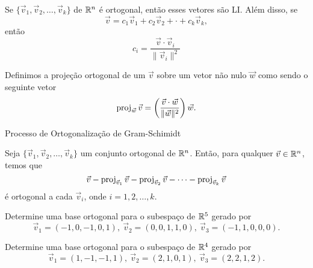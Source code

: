 \begin{frame}[label=orto]{}
\begin{teo}
Se $\{\vec{v}_1,\vec{v}_2,\ldots, \vec{v}_k\}$  de $\mathbb{R}^n$  é ortogonal, então esses vetores são LI. Além disso, se
\[\vec{v}=c_1\vec{v}_1+c_2\vec{v}_2+\cdot +c_k\vec{v}_k,\]
então
\[c_i=\frac{\vec{v}\cdot \vec{v}_i}{\|\vec{v}_i\|^2}\] 
\end{teo}

\begin{defin}
Definimos a {\color{blue}projeção ortogonal} de um $\vec{v}$ sobre um vetor  {\color{red} não nulo} $\vec{w}$ como sendo o seguinte vetor
\[\operatorname{proj}_{\vec{w}}\vec{v}=\left(\frac{\vec{v}\cdot \vec{w}}{\|\vec{w}\|^2}\right)\vec{w}.\]
\end{defin}


\end{frame}





\begin{frame}[label=orto]{Processo de Ortogonalização de Gram-Schimidt}
\begin{prop}
Seja $\{\vec{v}_1,\vec{v}_2,\ldots, \vec{v}_k\}$ um conjunto ortogonal  de $\mathbb{R}^n$. Então, para qualquer $\vec{v}\in \mathbb{R}^n$, temos que
\[\vec{v}-\operatorname{proj}_{{\vec{v}_1}}\vec{v}-\operatorname{proj}_{{\vec{v}_2}}\vec{v}-\cdots-\operatorname{proj}_{{\vec{v}_k}}\vec{v}\]
é ortogonal a cada $\vec{v}_i$, onde $i=1,2,\ldots,k$.
\end{prop}

\begin{exe}
Determine uma base ortogonal para o subespaço de $\mathbb{R}^5$ gerado por
\[\vec{v}_1=(-1,0,-1,0,1),\ \vec{v}_2=(0,0,1,1,0),\ \vec{v}_3=(-1,1,0,0,0).\]
\end{exe}
\end{frame}


\begin{frame}[label=orto]{}

\begin{casa}
Determine uma base ortogonal para o subespaço de $\mathbb{R}^4$ gerado por
\[\vec{v}_1=(1,-1,-1,1),\ \vec{v}_2=(2,1,0,1),\ \vec{v}_3=(2,2,1,2).\]
\end{casa}
\end{frame}






